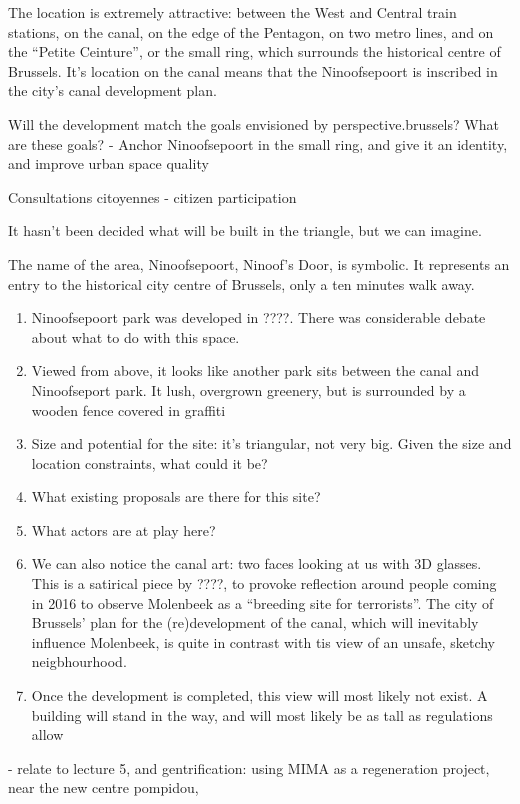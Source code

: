 \documentclass{article}
\begin{document}
The location is extremely attractive: between the West and Central train stations, on the canal, on the edge of the Pentagon, on two metro lines, and on the ``Petite Ceinture'', or the small ring, which surrounds the historical centre of Brussels. It's location on the canal means that the Ninoofsepoort is inscribed in the city's canal development plan.

Will the development match the goals envisioned by perspective.brussels?
What are these goals?
	- Anchor Ninoofsepoort in the small ring, and give it an identity, and improve urban space quality

Consultations citoyennes - citizen participation

It hasn't been decided what will be built in the triangle, but we can imagine.




The name of the area, Ninoofsepoort, Ninoof's Door, is symbolic. It represents an entry to the historical city centre of Brussels, only a ten minutes walk away. 

\begin{enumerate}
	\item Ninoofsepoort park was developed in ????. There was considerable debate about what to do with this space.
	\\ 
	\item Viewed from above, it looks like another park sits between the canal and Ninoofseport park. It lush, overgrown greenery, but is surrounded by a wooden fence covered in graffiti 
	\item Size and potential for the site: it's triangular, not very big. Given the size and location constraints, what could it be?
	\item What existing proposals are there for this site?
	\item What actors are at play here?
	\item We can also notice the canal art: two faces looking at us with 3D glasses. This is a satirical piece by ????, to provoke reflection around people coming in 2016 to observe Molenbeek as a ``breeding site for terrorists''. The city of Brussels' plan for the (re)development of the canal, which will inevitably influence Molenbeek, is quite in contrast with tis view of an unsafe, sketchy neigbhourhood.
	\item Once the development is completed, this view will most likely not exist. A building will stand in the way, and will most likely be as tall as regulations allow
	
\end{enumerate}


- relate to lecture 5, and gentrification: using MIMA as a regeneration project, near the new centre pompidou,


\pagebreak

\printbibliography 
\end{document}
